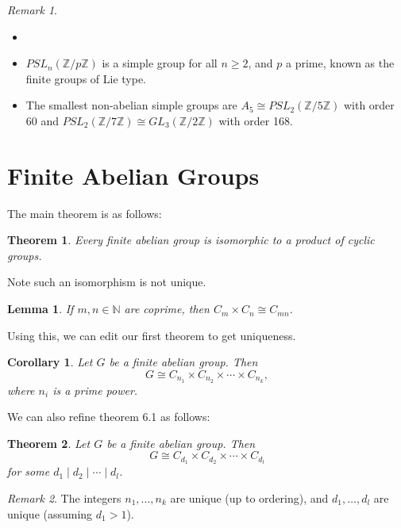 \documentclass[12pt]{article}
\newtheorem{theorem}{Theorem}[section]
\newtheorem{corollary}{Corollary}[section]
\newtheorem{lemma}{Lemma}[section]
\theoremstyle{definition}
\theoremstyle{remark}
\newtheorem*{remark}{Remark}
\begin{document}
\begin{remark}
	\begin{itemize}
		\item[]
		\item $PSL_n(\mathbb{Z} / p \mathbb{Z})$ is a simple group for all $n \geq 2$, and $p$ a prime, known as the finite groups of Lie type.
		\item The smallest non-abelian simple groups are $A_5 \cong PSL_2(\mathbb{Z} / 5 \mathbb{Z})$ with order 60 and $PSL_2(\mathbb{Z} / 7 \mathbb{Z}) \cong GL_3(\mathbb{Z} / 2 \mathbb{Z})$ with order 168.
	\end{itemize}
\end{remark}

\newpage

\section{Finite Abelian Groups}%
\label{sec:finite_abelian_groups}

The main theorem is as follows:

\begin{theorem}
	Every finite abelian group is isomorphic to a product of cyclic groups.
\end{theorem}

Note such an isomorphism is not unique.

\begin{lemma}
	If $m, n \in \mathbb{N}$ are coprime, then $C_m \times C_n \cong C_{mn}$.
\end{lemma}

Using this, we can edit our first theorem to get uniqueness.

\begin{corollary}
	Let $G$ be a finite abelian group. Then
	\[
	G \cong C_{n_1} \times C_{n_2} \times \cdots \times C_{n_k}
	,\]
	where $n_i$ is a prime power.
\end{corollary}

We can also refine theorem 6.1 as follows:

\begin{theorem}
	Let $G$ be a finite abelian group. Then
	\[
	G \cong C_{d_1} \times C_{d_2} \times \cdots \times C_{d_l}
	\]
	for some $d_1 \mid d_2 \mid \cdots \mid d_l$.
\end{theorem}

\begin{remark}
	The integers $n_1, \ldots, n_k$ are unique (up to ordering), and $d_1, \ldots, d_l$ are unique (assuming $d_1 > 1$).
\end{remark}
\end{document}

